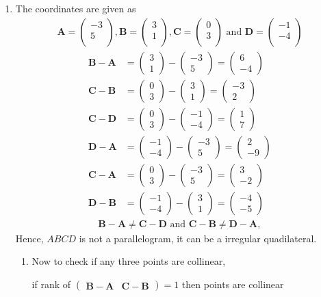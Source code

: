 \documentclass[12pt]{article}
\newcommand{\myvec}[1]{\ensuremath{\begin{pmatrix}#1\end{pmatrix}}}
\let\vec\mathbf
\begin{document}
\begin{enumerate}
\item The coordinates are given as
	\begin{align}
	\vec{A} = \myvec{
		-3\\
		5\\
		},
	\vec{B} = \myvec{
		3\\
		1\\
		},
	\vec{C} = \myvec{
		0\\
		3\\
		} \text{ and }
	\vec{D} = \myvec{
		-1\\
		-4\\
		}
	\end{align}
	\begin{align}
		\vec{B} - \vec{A} &= \myvec{3\\1} - \myvec{-3\\5} = \myvec{6\\-4}\\
		\vec{C} - \vec{B} &= \myvec{0\\3} - \myvec{3\\1} = \myvec{-3\\2}\\
		\vec{C} - \vec{D} &= \myvec{0\\3} - \myvec{-1\\-4} = \myvec{1\\7}\\
		\vec{D} - \vec{A} &= \myvec{-1\\-4} - \myvec{-3\\5} = \myvec{2\\-9}\\
		\vec{C} - \vec{A} &= \myvec{0\\3} - \myvec{-3\\5} = \myvec{3\\-2}\\
		\vec{D} - \vec{B} &= \myvec{-1\\-4} - \myvec{3\\1} = \myvec{-4\\-5}
	\end{align}
	\begin{align}
	\vec{B}-\vec{A} \neq \vec{C}-\vec{D} \text{ and } \vec{C}-\vec{B} \neq \vec{D}-\vec{A},
	\end{align}
	Hence, $ABCD$ is not a parallelogram, it can be a irregular quadilateral.
	\begin{enumerate}
		\item Now to check if any three points are collinear,

	if rank of $\myvec{\vec{B}-\vec{A} & \vec{C}-\vec{B}} = 1$ then points are collinear


\end{enumerate}
\end{enumerate}
\end{document}
